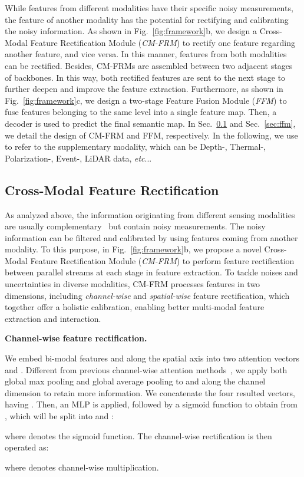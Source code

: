 \documentclass[journal]{IEEEtran}
\makeatletter
\DeclareRobustCommand\onedot{\futurelet\@let@token\@onedot}
\def\@onedot{\ifx\@let@token.\else.\null\fi\xspace}
\def\etc{\emph{etc}\onedot} \def\vs{\emph{vs}\onedot}
\makeatother
\begin{document}
While features from different modalities have their specific noisy measurements, the feature of another modality has the potential for rectifying and calibrating the noisy information.
As shown in Fig.~\ref{fig:framework}b, we design a Cross-Modal Feature Rectification Module (\emph{CM-FRM}) to rectify one feature regarding another feature, and vice versa. In this manner, features from both modalities can be rectified. 
Besides, CM-FRMs are assembled between two adjacent stages of backbones. In this way, both rectified features are sent to the next stage to further deepen and improve the feature extraction. {Furthermore, as shown in Fig.~\ref{fig:framework}c, we design a two-stage Feature Fusion Module (\emph{FFM}) to fuse features belonging to the same level into a single feature map. Then, a decoder is used to predict the final semantic map.}
In Sec.~\ref{sec:cm_frm} and Sec.~\ref{sec:ffm}, we detail the design of CM-FRM and FFM, respectively.
In the following, we use  to refer to the supplementary modality, which can be Depth-, Thermal-, Polarization-, Event-, LiDAR data, \etc.

\subsection{Cross-Modal Feature Rectification}
\label{sec:cm_frm}
As analyzed above, the information originating from different sensing modalities are usually complementary~\cite{hu2019acnet,chen2020sa_gate} but contain noisy measurements.
The noisy information can be filtered and calibrated by using features coming from another modality.
{To this purpose, in Fig.~\ref{fig:framework}b, we propose a novel Cross-Modal Feature Rectification Module (\emph{CM-FRM}) to perform feature rectification between parallel streams at each stage in feature extraction.} To tackle noises and uncertainties in diverse modalities, CM-FRM processes features in two dimensions, including \emph{channel-wise} and \emph{spatial-wise} feature rectification, which together offer a holistic calibration, enabling better multi-modal feature extraction and interaction.

\noindent\textbf{Channel-wise feature rectification.}
{We embed bi-modal features  and  along the spatial axis into two attention vectors  and .
Different from previous channel-wise attention methods~\cite{chen2020sa_gate,deng2021feanet,chen2017sca}, we apply both global max pooling and global average pooling to  and  along the channel dimension to retain more information.
We concatenate the four resulted vectors, having .
Then, an MLP is applied, followed by a sigmoid function to obtain  from , which will be split into  and :

where  denotes the sigmoid function. The channel-wise rectification is then operated as:

where  denotes channel-wise multiplication.}
\end{document}
